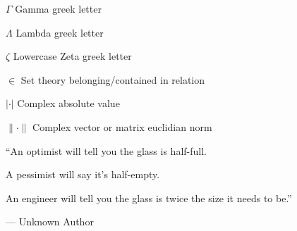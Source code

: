 \documentclass[a4paper]{apaThesis}
\begin{document}
\begingroup
	\makeatletter
		\def\chapter{\cleardoublepage\secdef\@chapter\@schapter}
		\def\@makeschapterhead#1{{\center\HUGE\sffamily\bfseries #1\par\nobreak\vskip 10\p@\vspace*{5mm} }}
	\makeatother

\begin{acronyms}
\end{acronyms}

\begin{listofsymbols}
	\item[$ \Gamma $] Gamma greek letter
	\item[$ \Lambda $] Lambda greek letter
	\item[$ \zeta $] Lowercase Zeta greek letter
	\item[$ \in $] Set theory belonging/contained in relation
	\item[$|\cdot|$] Complex absolute value
	\item[$\lVert \cdot \rVert$] Complex vector or matrix euclidian norm
\end{listofsymbols}

\endgroup


\tableofcontents*
\cleardoublepage

\pagestyle{fancy}


\begin{newepigraph}
``An optimist will tell you the glass is half-full.
				
A pessimist will say it's half-empty.

An engineer will tell you the glass is twice the size it needs to be.''

\hfill --- Unknown Author
\end{newepigraph}
\end{document}
